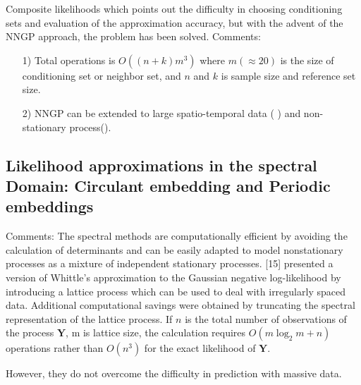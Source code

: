 \documentclass[
12pt, %
a4paper, %
oneside, %
headinclude,footinclude, %
BCOR5mm, %
]{scrartcl}
\begin{document}
Composite likelihoods which points out the difficulty in choosing conditioning sets and  evaluation of the approximation accuracy, but with the advent of the NNGP approach, the problem has been solved.
\textcolor[rgb]{1.00,0.00,1.00}{Comments:}
\begin{itemize}
 \item [1)] Total operations is $O((n + k)m^3)$ where $m (\approx 20)$ is the size of conditioning set or neighbor set, and $n$ and $k$ is sample size and reference set size.
 \item [2)] NNGP can be extended to large spatio-temporal data (
\href{https://chenyw68.github.io/Literature/[2016]Nonseparable dynamic NNGP models for large spatio-temporal data.pdf}{\cite{datta2016nonseparable}}) and non-stationary process(\href{https://chenyw68.github.io/Literature/[2020]Computationally efficient nonstationary nearest-neighborGaussian process models using data-driven techniques.pdf}{\cite{konomi2019computationally}}).
\end{itemize}
 

\subsection{Likelihood approximations in the spectral Domain: Circulant embedding and Periodic embeddings}
\href{https://chenyw68.github.io/Literature/[2020]Bayesian Inference for Big Spatial Data Using Non-stationary Spectral Simulation.pdf}{\citep{yang2020bayesian}}

\textcolor[rgb]{1.00,0.00,1.00}{Comments:}
The spectral methods are computationally efficient by avoiding the calculation of determinants and can be easily adapted to model nonstationary processes as a mixture of independent stationary processes. [15] presented a version of Whittle’s approximation to the Gaussian
negative log-likelihood by introducing a lattice process which can be used to deal with irregularly spaced data. Additional computational savings were obtained by truncating the spectral representation of the lattice process. If $n$ is the total number of observations of the process $\boldsymbol{Y}$, m is lattice size, the calculation requires $O(m \log_2 m + n)$ operations rather than $O(n^3)$ for the exact likelihood of $\boldsymbol{Y}$.

However, they do not overcome the difficulty in prediction with massive data.

%

\end{document}
